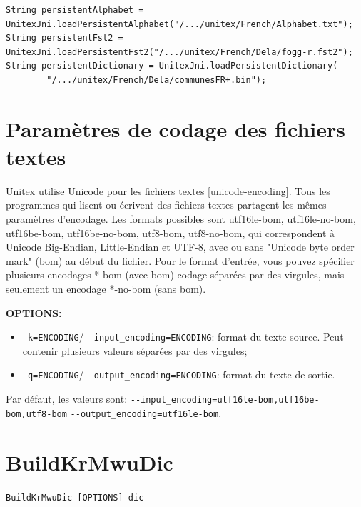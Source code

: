 \begin{verbatim}
String persistentAlphabet = UnitexJni.loadPersistentAlphabet("/.../unitex/French/Alphabet.txt");
String persistentFst2 = UnitexJni.loadPersistentFst2("/.../unitex/French/Dela/fogg-r.fst2");
String persistentDictionary = UnitexJni.loadPersistentDictionary(
		"/.../unitex/French/Dela/communesFR+.bin");
\end{verbatim}


\section{Paramètres de codage des fichiers textes}
\label{section-text-file-encoding-parameters}
Unitex utilise Unicode pour les fichiers textes \ref{unicode-encoding}. Tous les programmes qui
lisent ou écrivent des fichiers textes partagent les mêmes paramètres d'encodage. Les formats
possibles sont utf16le-bom, utf16le-no-bom, utf16be-bom, utf16be-no-bom, utf8-bom, utf8-no-bom, qui
correspondent à Unicode Big-Endian, Little-Endian et UTF-8, avec ou sans "Unicode byte order mark"
(bom) au début du fichier. Pour le format d'entrée, vous pouvez spécifier plusieurs encodages *-bom
(avec bom) codage séparées par des virgules, mais seulement un encodage *-no-bom (sans bom).

\bigskip
\noindent \textbf{OPTIONS:}
\begin{itemize}
\item \verb+-k=ENCODING+/\verb+--input_encoding=ENCODING+: format du texte source. Peut contenir
plusieurs valeurs séparées par des virgules;
\item \verb+-q=ENCODING+/\verb+--output_encoding=ENCODING+: format du texte de sortie. 
\end{itemize}

\noindent Par défaut, les valeurs sont: \verb+--input_encoding=utf16le-bom,utf16be-bom,utf8-bom+
\newline \verb+--output_encoding=utf16le-bom+.


\section{BuildKrMwuDic}
\verb+BuildKrMwuDic [OPTIONS] dic+

